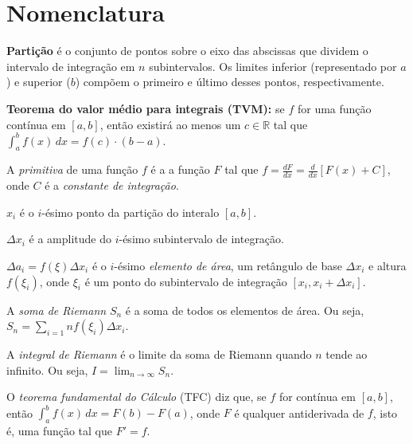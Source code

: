 \documentclass[a4paper,12pt]{scrartcl}
\begin{document}
\section*{Nomenclatura}
\begin{compactitem}
 \item {\bfseries Partição} é o conjunto de pontos sobre o eixo das abscissas que dividem o intervalo de integração em $n$ subintervalos. Os limites inferior (representado por $a$) e superior ($b$) compõem o primeiro e último desses pontos, respectivamente.
 
 \item {\bfseries Teorema do valor médio para integrais (TVM):} se $f$ for uma função contínua em $[a,b]$, então existirá ao menos um $c \in \mathbb{R}$ tal que $\int_a^b f(x)\,dx = f(c)\cdot(b-a)$.
 
 \item A \emph{primitiva} de uma função $f$ é a a função $F$ tal que $f = \frac{dF}{dx} = \frac{d}{dx}\left[F(x) + C\right]$, onde $C$ é a \emph{constante de integração}.
 
 \item $x_i$ é o $i$-ésimo ponto da partição do interalo $[a,b]$.
 
 \item $\Delta x_i$ é a amplitude do $i$-ésimo subintervalo de integração.
 
 \item $\Delta a_i = f(\xi) \Delta x_i$ é o $i$-ésimo \emph{elemento de área}, um retângulo de base $\Delta x_i$ e altura $f(\xi_i)$, onde $\xi_i$ é um ponto do subintervalo de integração $[x_i, x_i + \Delta x_i]$.
 
 \item A \emph{soma de Riemann} $S_n$ é a soma de todos os elementos de área. Ou seja, $S_n = \sum_{i=1}{n} f(\xi_i) \Delta x_i$.
 
 \item A \emph{integral de Riemann} é o limite da soma de Riemann quando $n$ tende ao infinito. Ou seja, $I = \lim_{n \to \infty} S_n$.
 
 \item O \emph{teorema fundamental do Cálculo} (TFC) diz que, se $f$ for contínua em $[a,b]$, então $\int_a^b f(x)\,dx = F(b) - F(a)$, onde $F$ é qualquer antiderivada de $f$, isto é, uma função tal que $F' = f$.
\end{compactitem}
\end{document}
